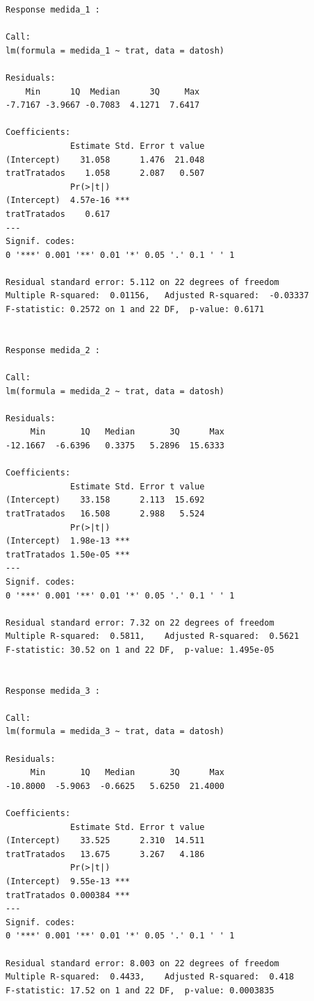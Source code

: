 \documentclass[
]{book}
\begin{document}
\begin{verbatim}
Response medida_1 :

Call:
lm(formula = medida_1 ~ trat, data = datosh)

Residuals:
    Min      1Q  Median      3Q     Max 
-7.7167 -3.9667 -0.7083  4.1271  7.6417 

Coefficients:
             Estimate Std. Error t value
(Intercept)    31.058      1.476  21.048
tratTratados    1.058      2.087   0.507
             Pr(>|t|)    
(Intercept)  4.57e-16 ***
tratTratados    0.617    
---
Signif. codes:  
0 '***' 0.001 '**' 0.01 '*' 0.05 '.' 0.1 ' ' 1

Residual standard error: 5.112 on 22 degrees of freedom
Multiple R-squared:  0.01156,   Adjusted R-squared:  -0.03337 
F-statistic: 0.2572 on 1 and 22 DF,  p-value: 0.6171


Response medida_2 :

Call:
lm(formula = medida_2 ~ trat, data = datosh)

Residuals:
     Min       1Q   Median       3Q      Max 
-12.1667  -6.6396   0.3375   5.2896  15.6333 

Coefficients:
             Estimate Std. Error t value
(Intercept)    33.158      2.113  15.692
tratTratados   16.508      2.988   5.524
             Pr(>|t|)    
(Intercept)  1.98e-13 ***
tratTratados 1.50e-05 ***
---
Signif. codes:  
0 '***' 0.001 '**' 0.01 '*' 0.05 '.' 0.1 ' ' 1

Residual standard error: 7.32 on 22 degrees of freedom
Multiple R-squared:  0.5811,    Adjusted R-squared:  0.5621 
F-statistic: 30.52 on 1 and 22 DF,  p-value: 1.495e-05


Response medida_3 :

Call:
lm(formula = medida_3 ~ trat, data = datosh)

Residuals:
     Min       1Q   Median       3Q      Max 
-10.8000  -5.9063  -0.6625   5.6250  21.4000 

Coefficients:
             Estimate Std. Error t value
(Intercept)    33.525      2.310  14.511
tratTratados   13.675      3.267   4.186
             Pr(>|t|)    
(Intercept)  9.55e-13 ***
tratTratados 0.000384 ***
---
Signif. codes:  
0 '***' 0.001 '**' 0.01 '*' 0.05 '.' 0.1 ' ' 1

Residual standard error: 8.003 on 22 degrees of freedom
Multiple R-squared:  0.4433,    Adjusted R-squared:  0.418 
F-statistic: 17.52 on 1 and 22 DF,  p-value: 0.0003835
\end{verbatim}
\end{document}
